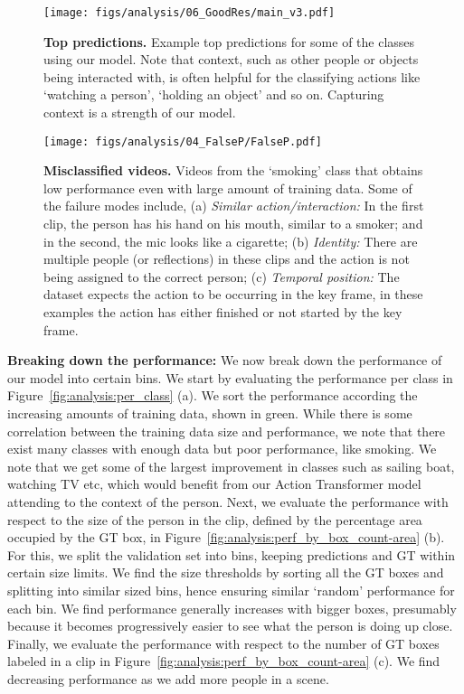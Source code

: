 \documentclass[10pt,twocolumn,letterpaper]{article}
\newcommand{\tx}[0]{Action Transformer}
\begin{document}
\begin{figure}[t]
\centering
\texttt{[image: figs/analysis/06\_GoodRes/main\_v3.pdf]}
\caption{
{\bf Top predictions.}
Example top predictions for some of the classes using our model.
Note that context, such as other people or objects being interacted with, is often helpful for the classifying actions like `watching a person', `holding an object' and so on. Capturing context is a strength of our model.
}\label{fig:analysis:true_p}
\end{figure}

\begin{figure}[t]
\centering
\texttt{[image: figs/analysis/04\_FalseP/FalseP.pdf]}
\caption{
{\bf Misclassified videos.}
Videos from the `smoking' class that obtains low performance even with large amount of training data.
Some of the failure modes include, (a) {\em Similar action/interaction:} In the first clip, the person has his hand on his mouth, similar to a smoker; and in the second, the mic looks like a cigarette; (b) {\em Identity:} There are multiple people (or reflections) in these clips and the action is not being assigned to the correct person; (c) {\em Temporal position:} The dataset expects the action to be occurring in the key frame, in these examples the action has either finished or not started by the key frame.
}\label{fig:analysis:false_p}
\end{figure}

{\bf \noindent Breaking down the performance:}
We now break down the performance of our model into certain bins. 
We start by evaluating the performance per class in Figure~\ref{fig:analysis:per_class} (a). We sort the performance according the increasing amounts of training data, shown in green. While there is some correlation between the training data size and performance, we note that there exist many classes with enough data but poor performance, like smoking. We note that we get some of the largest improvement in classes such as sailing boat, watching TV etc, which would benefit from our \tx{} model attending to the context of the person.
Next, we evaluate the performance with respect to the size of the person in the clip, defined by the percentage area occupied by the GT box, in Figure~\ref{fig:analysis:perf_by_box_count-area} (b). For this, we split the validation set into bins, keeping predictions and GT within certain size limits. We find the size thresholds by sorting all the GT boxes and splitting into similar sized bins, hence ensuring similar `random' performance for each bin. We find performance generally increases with bigger boxes, presumably because it becomes progressively easier to see what the person is doing up close.
Finally, we evaluate the performance with respect to the number of GT boxes labeled in a clip in Figure~\ref{fig:analysis:perf_by_box_count-area} (c). We find decreasing performance as we add more people in a scene.
\end{document}
